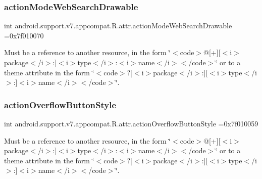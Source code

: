 \subsubsection{\texorpdfstring{action\+Mode\+Web\+Search\+Drawable}{actionModeWebSearchDrawable}}
{\footnotesize\ttfamily int android.\+support.\+v7.\+appcompat.\+R.\+attr.\+action\+Mode\+Web\+Search\+Drawable =0x7f010070\hspace{0.3cm}{\ttfamily [static]}}

Must be a reference to another resource, in the form \char`\"{}$<$code$>$@\mbox{[}+\mbox{]}\mbox{[}$<$i$>$package$<$/i$>$\+:\mbox{]}$<$i$>$type$<$/i$>$\+:$<$i$>$name$<$/i$>$$<$/code$>$\char`\"{} or to a theme attribute in the form \char`\"{}$<$code$>$?\mbox{[}$<$i$>$package$<$/i$>$\+:\mbox{]}\mbox{[}$<$i$>$type$<$/i$>$\+:\mbox{]}$<$i$>$name$<$/i$>$$<$/code$>$\char`\"{}. \mbox{\label{classandroid_1_1support_1_1v7_1_1appcompat_1_1R_1_1attr_a68be995b6a8f72f96ad87855fb5a8a7a}} 
\subsubsection{\texorpdfstring{action\+Overflow\+Button\+Style}{actionOverflowButtonStyle}}
{\footnotesize\ttfamily int android.\+support.\+v7.\+appcompat.\+R.\+attr.\+action\+Overflow\+Button\+Style =0x7f010059\hspace{0.3cm}{\ttfamily [static]}}

Must be a reference to another resource, in the form \char`\"{}$<$code$>$@\mbox{[}+\mbox{]}\mbox{[}$<$i$>$package$<$/i$>$\+:\mbox{]}$<$i$>$type$<$/i$>$\+:$<$i$>$name$<$/i$>$$<$/code$>$\char`\"{} or to a theme attribute in the form \char`\"{}$<$code$>$?\mbox{[}$<$i$>$package$<$/i$>$\+:\mbox{]}\mbox{[}$<$i$>$type$<$/i$>$\+:\mbox{]}$<$i$>$name$<$/i$>$$<$/code$>$\char`\"{}. \mbox{\label{classandroid_1_1support_1_1v7_1_1appcompat_1_1R_1_1attr_a1283b228e85a0bcb0890079d6db3f115}} 
